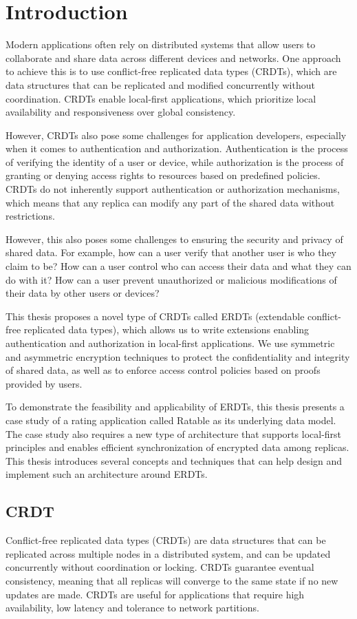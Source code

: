\documentclass[
	english,
	ruledheaders=section,   %
	class=report,		    %
	thesis={type=bachelor}, %
	accentcolor=9c,			%
	custommargins=true,    %
	marginpar=false,        %
	parskip=half-,          %
	fontsize=11pt,          %
]{tudapub}
\begin{document}
\chapter{Introduction}
Modern applications often rely on distributed systems that allow users to collaborate and share data across different devices and networks. One approach to achieve this is to use conflict-free replicated data types (CRDTs), which are data structures that can be replicated and modified concurrently without coordination. CRDTs enable local-first applications, which prioritize local availability and responsiveness over global consistency.

However, CRDTs also pose some challenges for application developers, especially when it comes to authentication and authorization. Authentication is the process of verifying the identity of a user or device, while authorization is the process of granting or denying access rights to resources based on predefined policies. CRDTs do not inherently support authentication or authorization mechanisms, which means that any replica can modify any part of the shared data without restrictions.

However, this also poses some challenges to ensuring the security and privacy of shared data. For example, how can a user verify that another user is who they claim to be? How can a user control who can access their data and what they can do with it? How can a user prevent unauthorized or malicious modifications of their data by other users or devices?

This thesis proposes a novel type of CRDTs called ERDTs (extendable conflict-free replicated data types), which allows us to write extensions enabling authentication and authorization in local-first applications. We use symmetric and asymmetric encryption techniques to protect the confidentiality and integrity of shared data, as well as to enforce access control policies based on proofs provided by users. 

To demonstrate the feasibility and applicability of ERDTs, this thesis presents a case study of a rating application called Ratable as its underlying data model. The case study also requires a new type of architecture that supports local-first principles and enables efficient synchronization of encrypted data among replicas. This thesis introduces several concepts and techniques that can help design and implement such an architecture around ERDTs.

\section{CRDT}
Conflict-free replicated data types (CRDTs) are data structures that can be replicated across multiple nodes in a distributed system, and can be updated concurrently without coordination or locking. CRDTs guarantee eventual consistency, meaning that all replicas will converge to the same state if no new updates are made. CRDTs are useful for applications that require high availability, low latency and tolerance to network partitions.
\end{document}

